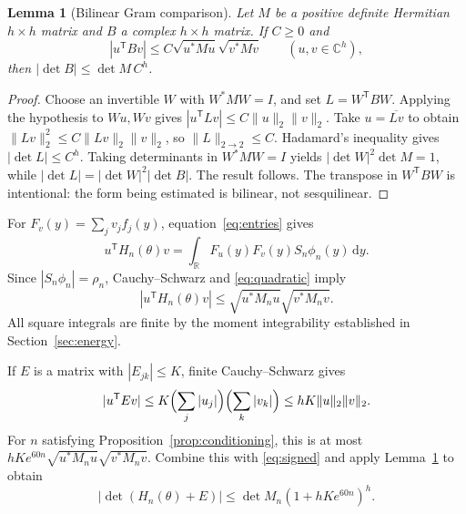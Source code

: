 \documentclass[11pt]{article}
\newtheorem{lemma}[theorem]{Lemma}
\numberwithin{equation}{section}
\newcommand{\R}{\mathbb R}
\newcommand{\C}{\mathbb C}
\newcommand{\dd}{\,\mathrm d}
\begin{document}
\begin{lemma}[Bilinear Gram comparison]\label{lem:comparison}
Let $M$ be a positive definite Hermitian $h\times h$ matrix and $B$ a
complex $h\times h$ matrix. If $C\geq0$ and
\[
 |u^{\mathsf T}Bv|\leq C\sqrt{u^*Mu}\sqrt{v^*Mv}
                       \qquad(u,v\in\C^h),
\]
then $|\det B|\leq\det M\,C^h$.
\end{lemma}
\begin{proof}
Choose an invertible $W$ with $W^*MW=I$, and set $L=W^{\mathsf T}BW$.
Applying the hypothesis to $Wu,Wv$ gives
$|u^{\mathsf T}Lv|\leq C\|u\|_2\|v\|_2$.
Take $u=\overline{Lv}$ to obtain
$\|Lv\|_2^2\leq C\|Lv\|_2\|v\|_2$, so $\|L\|_{2\to2}\leq C$.
Hadamard's inequality gives $|\det L|\leq C^h$.
Taking determinants in $W^*MW=I$ yields
$|\det W|^2\det M=1$, while
$|\det L|=|\det W|^2|\det B|$. The result follows.
The transpose in $W^{\mathsf T}BW$ is intentional: the form being
estimated is bilinear, not sesquilinear.
\end{proof}

For $F_v(y)=\sum_jv_jf_j(y)$, equation~\eqref{eq:entries} gives
\[
 u^{\mathsf T}H_n(\theta)v
                    =\int_\R F_u(y)F_v(y)S_n\phi_n(y)\dd y.
\]
Since $|S_n\phi_n|=\rho_n$, Cauchy--Schwarz and
\eqref{eq:quadratic} imply
\begin{equation}\label{eq:signed}
 |u^{\mathsf T}H_n(\theta)v|
                    \leq\sqrt{u^*M_nu}\sqrt{v^*M_nv}.
\end{equation}
All square integrals are finite by the moment integrability established
in Section~\ref{sec:energy}.

If $E$ is a matrix with $|E_{jk}|\leq K$, finite Cauchy--Schwarz gives
\[
 |u^{\mathsf T}Ev|\leq K\Bigl(\sum_j|u_j|\Bigr)
                          \Bigl(\sum_k|v_k|\Bigr)
               \leq hK\|u\|_2\|v\|_2.
\]
For $n$ satisfying Proposition~\ref{prop:conditioning}, this is at most
$hKe^{60n}\sqrt{u^*M_nu}\sqrt{v^*M_nv}$.
Combine this with \eqref{eq:signed} and apply
Lemma~\ref{lem:comparison} to obtain
\begin{equation}\label{eq:perturbation}
       |\det(H_n(\theta)+E)|\leq\det M_n(1+hKe^{60n})^h.
\end{equation}
\end{document}
